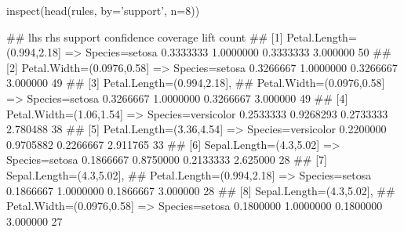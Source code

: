\begin{Schunk}
% --begin: "casestudy-assoc-arules-view"
\begin{Sinput}
inspect(head(rules, by='support', n=8))
\end{Sinput}
\begin{Soutput}
##     lhs                            rhs                    support confidence  coverage     lift count
## [1] {Petal.Length=(0.994,2.18]} => {Species=setosa}     0.3333333  1.0000000 0.3333333 3.000000    50
## [2] {Petal.Width=(0.0976,0.58]} => {Species=setosa}     0.3266667  1.0000000 0.3266667 3.000000    49
## [3] {Petal.Length=(0.994,2.18],                                                                      
##      Petal.Width=(0.0976,0.58]} => {Species=setosa}     0.3266667  1.0000000 0.3266667 3.000000    49
## [4] {Petal.Width=(1.06,1.54]}   => {Species=versicolor} 0.2533333  0.9268293 0.2733333 2.780488    38
## [5] {Petal.Length=(3.36,4.54]}  => {Species=versicolor} 0.2200000  0.9705882 0.2266667 2.911765    33
## [6] {Sepal.Length=(4.3,5.02]}   => {Species=setosa}     0.1866667  0.8750000 0.2133333 2.625000    28
## [7] {Sepal.Length=(4.3,5.02],                                                                        
##      Petal.Length=(0.994,2.18]} => {Species=setosa}     0.1866667  1.0000000 0.1866667 3.000000    28
## [8] {Sepal.Length=(4.3,5.02],                                                                        
##      Petal.Width=(0.0976,0.58]} => {Species=setosa}     0.1800000  1.0000000 0.1800000 3.000000    27
\end{Soutput}
%
% --end: "casestudy-assoc-arules-view"
\end{Schunk}

